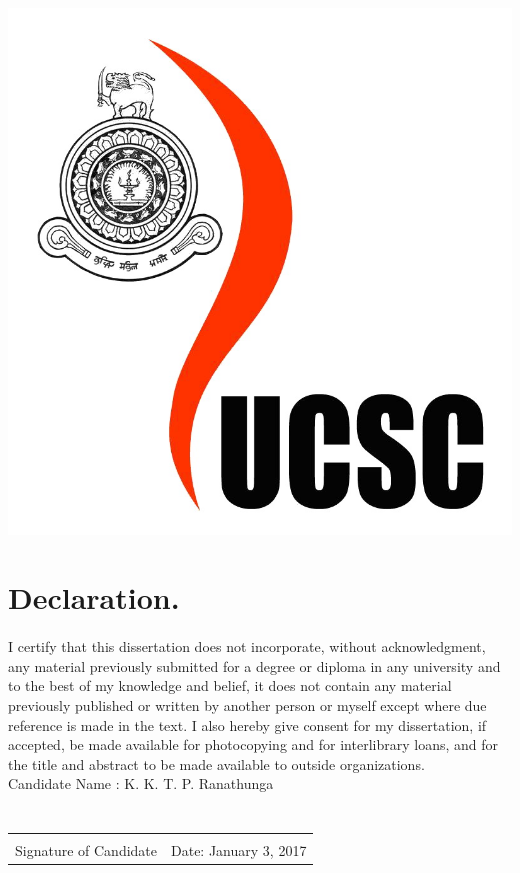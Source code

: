 \documentclass[12pt]{article}
\numberwithin{figure}{section}
\numberwithin{table}{section}
\begin{document}
\begin{titlepage}
\includegraphics[scale=0.06]{ucsc}
\vfill %
\end{titlepage}
\section*{Declaration.}
\paragraph{}
I certify that this dissertation does not incorporate, without acknowledgment,
any material previously submitted for a degree or diploma in any university and to
the best of my knowledge and belief, it does not contain any material previously
published or written by another person or myself except where due reference is
made in the text. I also hereby give consent for my dissertation, if accepted, be
made available for photocopying and for interlibrary loans, and for the title and
abstract to be made available to outside organizations.
\\


Candidate Name : K. K. T. P. Ranathunga
\\
\\
\paragraph{}
\noindent
\begin{tabular}{ll}
		\makebox[2.5in]{\hrulefill} \\
			Signature of Candidate & Date: January 3, 2017\\		
\end{tabular}
		
\end{document}
